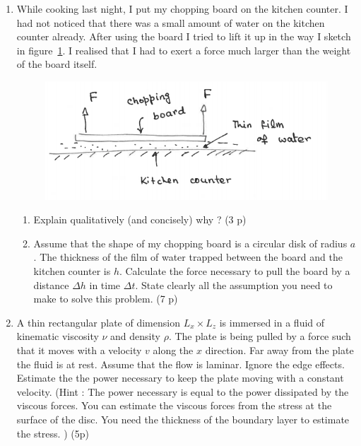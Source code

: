 \documentclass[12pt,a4paper]{article}
\begin{document}
\begin{enumerate}

\item \label{prb1}

  While cooking last night, I put my chopping board on the
    kitchen counter. I had not noticed that there was a small amount
    of water on the kitchen counter already. After using the board I
    tried to lift it up in the way I sketch in
    figure~\ref{fig:board}. I realised that I had to exert a force much
    larger than the weight of the board itself.
  \begin{figure}[h]
    \includegraphics[width=0.5\linewidth]{board.png}
    \label{fig:board}
   \end{figure}
    \begin{enumerate}
    \item Explain qualitatively (and concisely) why ? (3 p)
    \item Assume that the shape of my chopping board is a circular
      disk of radius $a$. The thickness of the film of
      water trapped between the board and the kitchen counter is $h$.
      Calculate the force necessary to pull the board by a distance
      $\Delta h$ in time $\Delta t$. State clearly all the assumption
      you need to make to solve this problem. (7 p)
    \end{enumerate}
\item
  \label{prb2} A thin rectangular plate of dimension $L_x\times L_z$ 
is immersed in a fluid  of
kinematic viscosity $\nu$ and density $\rho$. The plate is being
pulled by a force such that it moves with a velocity $v$ along the $x$
direction. Far away from the plate the fluid is at rest. Assume that the flow is
  laminar. Ignore the edge effects. 
  Estimate the the power necessary to keep the plate moving with a constant velocity.
    (Hint : The power necessary
    is equal to the power dissipated by the viscous forces. You can estimate the
    viscous forces from the stress at the surface of the disc. You need the
    thickness of the boundary layer to estimate the stress. ) (5p)
 

\end{enumerate}
\end{document}
